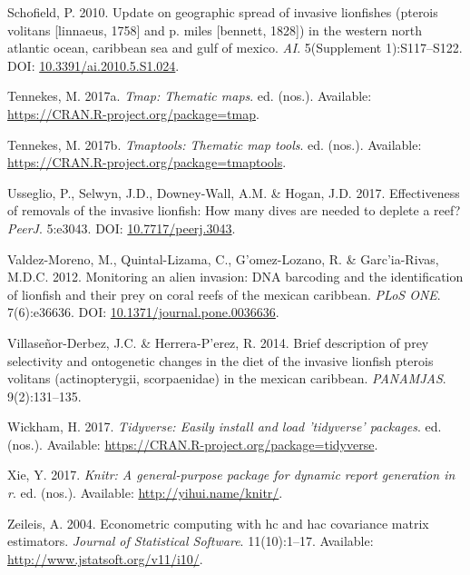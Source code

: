 \documentclass[12pt,]{article}
\begin{document}
\hypertarget{ref-schofield_2010}{}
Schofield, P. 2010. Update on geographic spread of invasive lionfishes
(pterois volitans {[}linnaeus, 1758{]} and p. miles {[}bennett, 1828{]})
in the western north atlantic ocean, caribbean sea and gulf of mexico.
\emph{AI}. 5(Supplement 1):S117--S122. DOI:
\href{https://doi.org/10.3391/ai.2010.5.S1.024}{10.3391/ai.2010.5.S1.024}.

\hypertarget{ref-tmap_2017}{}
Tennekes, M. 2017a. \emph{Tmap: Thematic maps}. ed. (nos.). Available:
\url{https://CRAN.R-project.org/package=tmap}.

\hypertarget{ref-tmaptools_2017}{}
Tennekes, M. 2017b. \emph{Tmaptools: Thematic map tools}. ed. (nos.).
Available: \url{https://CRAN.R-project.org/package=tmaptools}.

\hypertarget{ref-usseglio_2017}{}
Usseglio, P., Selwyn, J.D., Downey-Wall, A.M. \& Hogan, J.D. 2017.
Effectiveness of removals of the invasive lionfish: How many dives are
needed to deplete a reef? \emph{PeerJ}. 5:e3043. DOI:
\href{https://doi.org/10.7717/peerj.3043}{10.7717/peerj.3043}.

\hypertarget{ref-valdezmoreno_2012}{}
Valdez-Moreno, M., Quintal-Lizama, C., G\a'omez-Lozano, R. \&
Garc\a'ia-Rivas, M.D.C. 2012. Monitoring an alien invasion: DNA
barcoding and the identification of lionfish and their prey on coral
reefs of the mexican caribbean. \emph{PLoS ONE}. 7(6):e36636. DOI:
\href{https://doi.org/10.1371/journal.pone.0036636}{10.1371/journal.pone.0036636}.

\hypertarget{ref-villaseorderbez_2014}{}
Villaseñor-Derbez, J.C. \& Herrera-P\a'erez, R. 2014. Brief description
of prey selectivity and ontogenetic changes in the diet of the invasive
lionfish pterois volitans (actinopterygii, scorpaenidae) in the mexican
caribbean. \emph{PANAMJAS}. 9(2):131--135.

\hypertarget{ref-tidyverse_2017}{}
Wickham, H. 2017. \emph{Tidyverse: Easily install and load 'tidyverse'
packages}. ed. (nos.). Available:
\url{https://CRAN.R-project.org/package=tidyverse}.

\hypertarget{ref-knitr_2017}{}
Xie, Y. 2017. \emph{Knitr: A general-purpose package for dynamic report
generation in r}. ed. (nos.). Available: \url{http://yihui.name/knitr/}.

\hypertarget{ref-sandwich_2014}{}
Zeileis, A. 2004. Econometric computing with hc and hac covariance
matrix estimators. \emph{Journal of Statistical Software}. 11(10):1--17.
Available: \url{http://www.jstatsoft.org/v11/i10/}.
\end{document}
